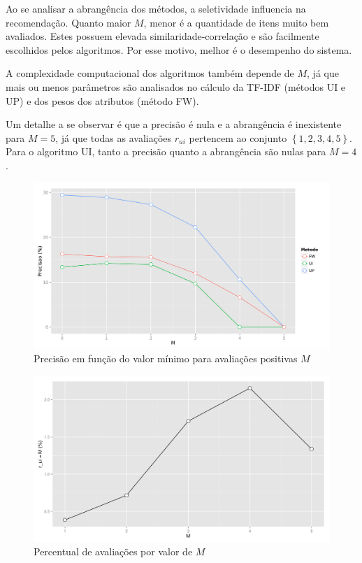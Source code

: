 Ao se analisar a abrangência dos métodos, a seletividade influencia na recomendação. Quanto maior $M$, menor é a quantidade de itens muito bem avaliados. Estes possuem elevada similaridade-correlação e são facilmente escolhidos pelos algoritmos. Por esse motivo, melhor é o desempenho do sistema.

A complexidade computacional dos algoritmos também depende de $M$, já que mais ou menos parâmetros são analisados no cálculo da TF-IDF (métodos UI e UP) e dos pesos dos atributos (método FW).

Um detalhe a se observar é que a precisão é nula e a abrangência é inexistente para $M=5$, já que todas as avaliações $r_{ui}$ pertencem ao conjunto $\left\{1,2,3,4,5\right\}$. 
Para o algoritmo UI, tanto a precisão quanto a abrangência são nulas para $M=4$.

\begin{figure}[htp]
    \begin{center}
    \includegraphics[width=1\textwidth]{img/precision_M}
    \end{center}
    \label{fig:precision_M}
    \caption{Precisão em função do valor mínimo para avaliações positivas $M$}
\end{figure}

\begin{figure}[htp]
    \begin{center}
    \includegraphics[width=1\textwidth]{img/percentual_M}
    \end{center}
    \label{fig:percentual_M}
    \caption{Percentual de avaliações por valor de $M$}
\end{figure}

